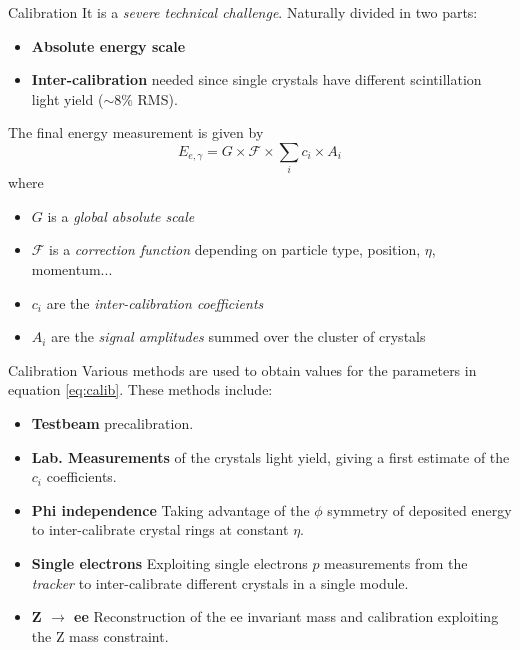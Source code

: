 \documentclass[10pt]{beamer}
\begin{document}
\begin{frame}{Calibration}
    It is a \emph{severe technical challenge}.
    Naturally divided in two parts:
    \begin{itemize}
        \item \textbf{Absolute energy scale}
        \item \textbf{Inter-calibration} needed since single crystals have different scintillation light yield ($\sim 8\%$ RMS).
    \end{itemize}
    The final energy measurement is given by
    \begin{equation}
        E_{e,\gamma} = G \times \mathcal{F} \times \sum_i c_i \times A_i
    \label{eq:calib}
    \end{equation}
    where
    \begin{itemize}
        \item $G$ is a \emph{global absolute scale}
        \item $\mathcal{F}$ is a \emph{correction function} depending on particle type, position, $\eta$, momentum...
        \item $c_i$ are the \emph{inter-calibration coefficients}
        \item $A_i$ are the \emph{signal amplitudes} summed over the cluster of crystals 
    \end{itemize}{}
    
\end{frame}

\begin{frame}{Calibration}
    Various methods are used to obtain values for the parameters in equation \eqref{eq:calib}. These methods include:
    
    \begin{itemize}
        \item \textbf{Testbeam} precalibration.
        \item \textbf{Lab. Measurements} of the crystals light yield, giving a first estimate of the $c_i$ coefficients.
        \item \textbf{Phi independence} Taking advantage of the $\phi$ symmetry of deposited energy to inter-calibrate crystal rings at constant $\eta$.
        \item \textbf{Single electrons} Exploiting single electrons $p$ measurements from the \emph{tracker} to inter-calibrate different crystals in a single module.
        \item \textbf{Z $\rightarrow$ ee} Reconstruction of the ee invariant mass and calibration exploiting the Z mass constraint. 
    \end{itemize}
    
\end{frame}
\end{document}
